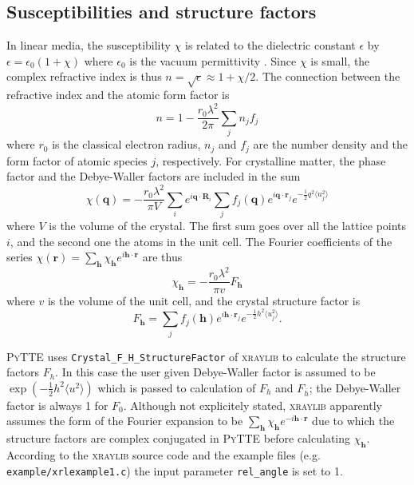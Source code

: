 \documentclass[11pt,a4paper]{article}
\begin{document}
\subsection{Susceptibilities and structure factors}
In linear media, the susceptibility $\chi$ is related to the dielectric constant $\epsilon$ by $\epsilon = \epsilon_0 (1 + \chi)$ where $\epsilon_0$ is the vacuum permittivity  \cite{del_Coso_2004}. Since $\chi$ is small, the complex refractive index is thus $n = \sqrt{\epsilon} \approx 1 + \chi/2$. The connection between the refractive index and the atomic form factor is \cite{Chantler_1995}
\begin{equation}
n = 1 - \frac{r_0 \lambda^2}{2 \pi} \sum_j n_j f_j
\end{equation}
where $r_0$ is the classical electron radius, $n_j$ and $f_j$ are the number density and the form factor of atomic species $j$, respectively. For crystalline matter, the phase factor and the Debye-Waller factors are included in the sum
\begin{equation}
\chi(\mathbf{q}) =  - \frac{r_0 \lambda^2}{\pi V} \sum_{i} e^{i \mathbf{q} \cdot \mathbf{R}_i}  \sum_j f_j(\mathbf{q})  e^{i \mathbf{q} \cdot \mathbf{r}_j}  e^{-\tfrac{1}{2}q^2 \langle u_j^2 \rangle}
\end{equation}
where $V$ is the volume of the crystal. The first sum goes over all the lattice points $i$, and the second one the atoms in the unit cell. The Fourier coefficients of the series $\chi(\mathbf{r}) = \sum_{\mathbf{h}} \chi_{\mathbf{h}} e^{i\mathbf{h} \cdot \mathbf{r}}$ are thus
\begin{equation}
\chi_\mathbf{h} =  - \frac{r_0 \lambda^2}{\pi v}  F_{\mathbf{h}}
\end{equation}
where $v$ is the volume of the unit cell, and the crystal structure factor is
\begin{equation}
F_{\mathbf{h}} = \sum_j f_j(\mathbf{h})  e^{i \mathbf{h} \cdot \mathbf{r}_j}  e^{-\tfrac{1}{2}h^2 \langle u_j^2 \rangle}.
\end{equation}

\textsc{PyTTE} uses \texttt{Crystal\_F\_H\_StructureFactor} of \textsc{xraylib} to calculate the structure factors $F_h$. In this case the user given Debye-Waller factor is assumed to be $\exp(-\tfrac{1}{2}h^2 \langle u^2 \rangle)$ which is passed to calculation of $F_h$ and $F_{\bar{h}}$; the Debye-Waller factor is always 1 for $F_0$. Although not explicitely stated, \textsc{xraylib} apparently assumes the form of the Fourier expansion to be $\sum_{\mathbf{h}} \chi_{\mathbf{h}} e^{-i\mathbf{h} \cdot \mathbf{r}}$ due to which the structure factors are complex conjugated in \textsc{PyTTE} before calculating $\chi_{\mathbf{h}}$. According to the \textsc{xraylib} source code and the example files (e.g. \texttt{example/xrlexample1.c}) the input parameter \texttt{rel\_angle} is set to 1.
\end{document}
